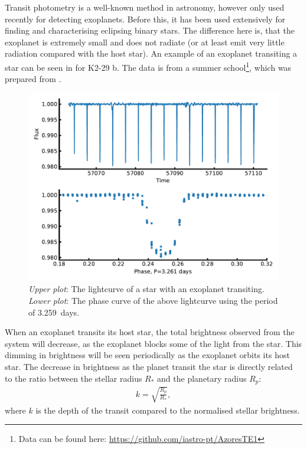 Transit photometry is a well-known method in astronomy, however only used recently for detecting
exoplanets. Before this, it has been used extensively for finding and characterising eclipsing
binary stars. The difference here is, that the exoplanet is extremely small and does not radiate (or
at least emit very little radiation compared with the host star). An example of an exoplanet
transiting a star can be seen in  for K2-29 b. The data is from a summer
school\footnote{Data can be found here: \url{https://github.com/iastro-pt/AzoresTE1}}, which was
prepared from \citet{Santerne2016}.

\begin{figure}[htpb!]
    \centering
    \includegraphics[width=1.0\linewidth]{figures/transitMethod.pdf}
    \caption{\emph{Upper plot}: The lightcurve of a star with an exoplanet transiting.
             \emph{Lower plot}: The phase curve of the above lightcurve using the period of
             \SI{3.259}{days}.}
    \label{fig:transitMethod}
\end{figure}

When an exoplanet transits its host star, the total brightness observed from the system will
decrease, as the exoplanet blocks some of the light from the star. This dimming in brightness will
be seen periodically as the exoplanet orbits its host star. The decrease in brightness as the planet
transit the star is directly related to the ratio between the stellar radius $R_\ast$ and the
planetary radius $R_p$:
\begin{align}
  k = \sqrt{\frac{R_p}{R_\ast}},  \label{eq:transit}
\end{align}
where $k$ is the depth of the transit compared to the normalised stellar brightness.

